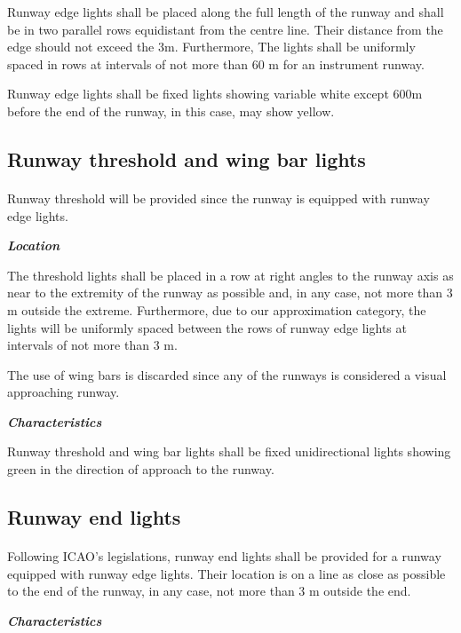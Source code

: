 		Runway edge lights shall be placed along the full length of the runway and shall be in two parallel rows equidistant from the centre line. Their distance from the edge should not exceed the 3m. Furthermore, The lights shall be uniformly spaced in rows at intervals of not more than 60 m for an instrument runway. 
		
		Runway edge lights shall be fixed lights showing variable white except 600m before the end of the runway, in this case, may show yellow.
		
		\subsection{Runway threshold and wing bar lights} 
		\paragraph{}Runway threshold will be provided since the runway is equipped with runway edge lights.
		
		\textbf{\textit{Location}}
		
		The threshold lights shall be placed in a row at right angles to the runway axis as near to the extremity of the runway as possible and, in any case, not more than 3 m outside the extreme. Furthermore, due to our approximation category, the lights will be uniformly spaced between the rows of runway edge lights at intervals of not more than 3 m.
		
		The use of wing bars is discarded since any of the runways is considered a visual approaching runway.
		
		\textbf{\textit{Characteristics}}
		
		Runway threshold and wing bar lights shall be fixed unidirectional lights showing green in the direction of approach to the runway.
		
		\subsection{Runway end lights}
		\paragraph{}Following ICAO's legislations, runway end lights shall be provided for a runway equipped with runway edge lights. Their location is on a line as close as possible to the end of the runway, in any case, not more than 3 m outside the end.
		
		\textbf{\textit{Characteristics}}
		
